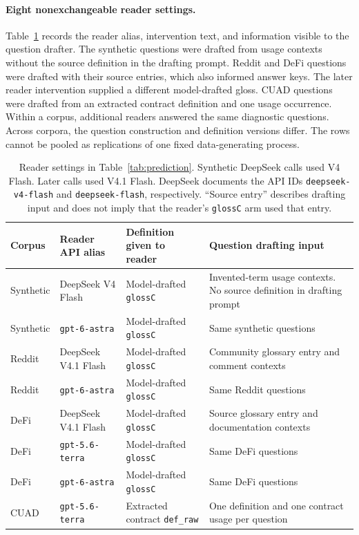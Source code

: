 \paragraph{Eight nonexchangeable reader settings.}\label{app:setting-design}
Table~\ref{tab:setting-design} records the reader alias, intervention text, and information visible to the question drafter. The synthetic questions were drafted from usage contexts without the source definition in the drafting prompt. Reddit and DeFi questions were drafted with their source entries, which also informed answer keys. The later reader intervention supplied a different model-drafted gloss. CUAD questions were drafted from an extracted contract definition and one usage occurrence. Within a corpus, additional readers answered the same diagnostic questions. Across corpora, the question construction and definition versions differ. The rows cannot be pooled as replications of one fixed data-generating process.

\begin{table}[h]\centering\footnotesize
\caption{Reader settings in Table~\ref{tab:prediction}. Synthetic DeepSeek calls used V4 Flash. Later calls used V4.1 Flash. DeepSeek documents the API IDs \texttt{deepseek-v4-flash} and \texttt{deepseek-flash}, respectively. ``Source entry'' describes drafting input and does not imply that the reader's \texttt{glossC} arm used that entry.}
\label{tab:setting-design}
\begin{tabular}{@{}>{\raggedright\arraybackslash}p{1.5cm}>{\raggedright\arraybackslash}p{3.0cm}>{\raggedright\arraybackslash}p{3.4cm}>{\raggedright\arraybackslash}p{4.7cm}@{}}\toprule
Corpus & Reader API alias & Definition given to reader & Question drafting input\\\midrule
Synthetic & DeepSeek V4 Flash & Model-drafted \texttt{glossC} & Invented-term usage contexts. No source definition in drafting prompt\\
Synthetic & \texttt{gpt-6-astra} & Model-drafted \texttt{glossC} & Same synthetic questions\\
Reddit & DeepSeek V4.1 Flash & Model-drafted \texttt{glossC} & Community glossary entry and comment contexts\\
Reddit & \texttt{gpt-6-astra} & Model-drafted \texttt{glossC} & Same Reddit questions\\
DeFi & DeepSeek V4.1 Flash & Model-drafted \texttt{glossC} & Source glossary entry and documentation contexts\\
DeFi & \texttt{gpt-5.6-terra} & Model-drafted \texttt{glossC} & Same DeFi questions\\
DeFi & \texttt{gpt-6-astra} & Model-drafted \texttt{glossC} & Same DeFi questions\\
CUAD & \texttt{gpt-5.6-terra} & Extracted contract \texttt{def\_raw} & One definition and one contract usage per question\\\bottomrule
\end{tabular}
\end{table}
